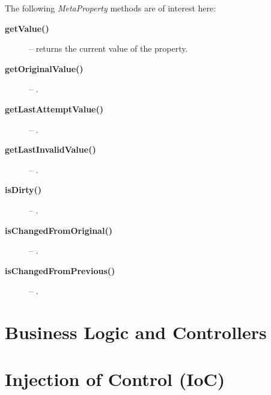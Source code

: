   The following \emph{MetaProperty} methods are of interest here:
  \begin{description}
    \item[\textbf{getValue()}] -- returns the current value of the property.
    \item[\textbf{getOriginalValue()}] -- .
    \item[\textbf{getLastAttemptValue()}] -- .
    \item[\textbf{getLastInvalidValue()}] -- .
    \item[\textbf{isDirty()}] -- .
    \item[\textbf{isChangedFromOriginal()}] -- .
    \item[\textbf{isChangedFromPrevious()}] -- .
  \end{description}
  

\section{Business Logic and Controllers}

% 
% 
% 
% 
\section{Injection of Control (IoC)}\label{ch01:01:IoC}
